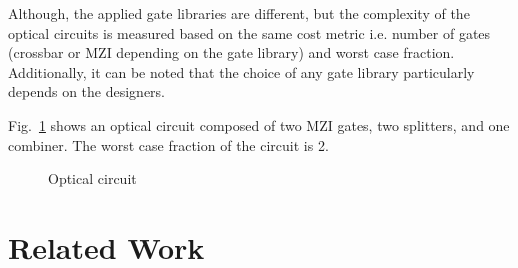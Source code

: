 \documentclass[10pt,letterpaper,twoside,openright]{book}
\begin{document}

Although, the applied gate libraries are different, but the complexity of the optical circuits is measured based on the same cost metric i.e. number of gates (crossbar or MZI depending on the gate library) and worst case fraction. Additionally, it can be noted that the choice of any gate library particularly depends on the designers. 
 

\begin{example}
Fig.~\ref{fig:circuit} shows an optical circuit composed of two MZI gates, two splitters, and one combiner. The worst case fraction of the circuit is 2.
\end{example}

\begin{figure}[!h]
\centering
{}
\vspace{-.1cm}
\caption{Optical circuit}\vspace{-.5cm}
\label{fig:circuit}
\end{figure}

\section{Related Work}
\end{document}

